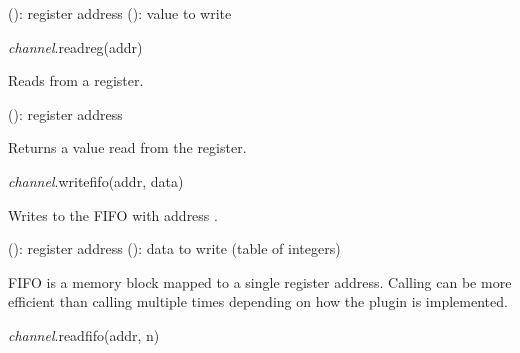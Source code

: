 \documentclass[a4paper,12pt,twoside,extrafontsizes]{memoir}
\begin{document}
\begin{funcparams}
	 (): register address
	 (): value to write
\end{funcparams}


\begin{luafuncprototype}
\emph{channel}.readreg(addr)
\end{luafuncprototype}

\begin{funcdescr}
	Reads from a register.
\end{funcdescr}

\begin{funcparams}
	 (): register address
\end{funcparams}

\begin{funcret}
	Returns a value read from the register.
\end{funcret}


\begin{luafuncprototype}
\emph{channel}.writefifo(addr, data)
\end{luafuncprototype}

\begin{funcdescr}
	Writes  to the FIFO with address .
\end{funcdescr}

\begin{funcparams}
	 (): register address
	 (): data to write (table of integers)
\end{funcparams}

\begin{funcremarks}
	FIFO is a memory block mapped to a single register address. Calling  can be more efficient than calling  multiple times depending on how the plugin is implemented.
\end{funcremarks}


\begin{luafuncprototype}
\emph{channel}.readfifo(addr, n)
\end{luafuncprototype}
\end{document}
